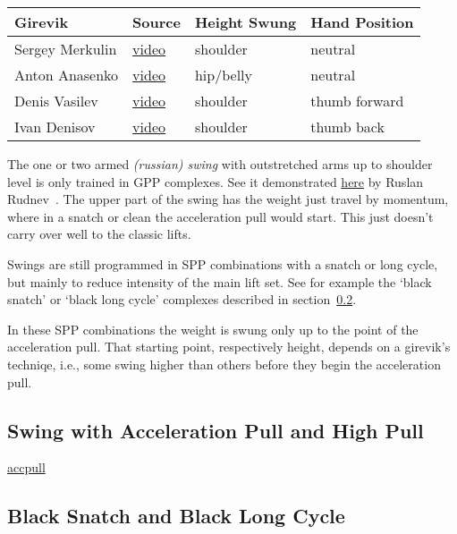 \documentclass[a4paper,11pt,oneside]{article}
\begin{document}
\begin{center}
\begin{tabular}{llll}
Girevik & Source & Height Swung & Hand Position \\
\hline
Sergey Merkulin & \href{https://youtu.be/J3Vict1FzZI}{video}~\cite{merkulin_swings} 
  & shoulder & neutral \\
Anton Anasenko & \href{https://youtu.be/kOKHlc8EK8o}{video}~\cite{anasenko_swings} 
  & hip/belly & neutral \\
Denis Vasilev & \href{https://youtu.be/KwMjdjHtx1U}{video}~\cite{vasilev_swings} 
  & shoulder & thumb forward \\
Ivan Denisov & \href{https://youtu.be/qEtdQgHLFAQ}{video}~\cite{denisov_swings} 
  & shoulder & thumb back \\
\hline
\end{tabular}
\end{center}

The one or two armed \emph{(russian) swing} with outstretched arms up to shoulder 
level is only trained in GPP complexes. See it demonstrated 
\href{https://youtu.be/T2Sx7qi1TcQ?t=167}{here} by Ruslan Rudnev~\cite{rkbyten_swings}. 
The upper part of the swing has the weight just travel by momentum, where in a 
snatch  or clean the acceleration pull would start. This just doesn't carry over 
well to the classic lifts. 

Swings are still programmed in SPP combinations with a snatch or long cycle, but 
mainly to reduce intensity of the main lift set. See for example the `black snatch' 
or `black long cycle' complexes described in section~\ref{blacksnatchlc}.

In these SPP combinations the weight is swung only up to the point of the acceleration 
pull. That starting point, respectively height, depends on a girevik's techniqe, i.e., 
some swing higher than others before they begin the acceleration pull.


\subsection{Swing with Acceleration Pull and High Pull}

\href{https://youtu.be/T2Sx7qi1TcQ?t=369}{accpull}


\subsection{Black Snatch and Black Long Cycle}
\label{blacksnatchlc}
\end{document}
